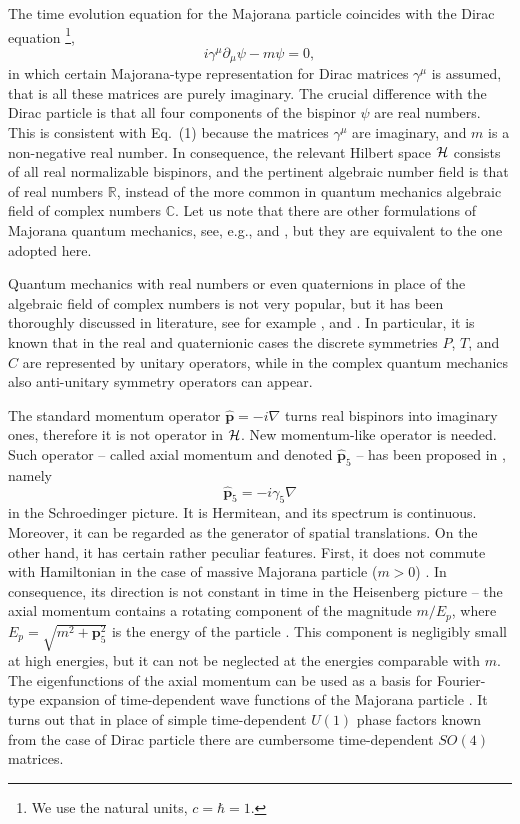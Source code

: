 \documentclass[12pt]{article}
\begin{document}
The time  evolution equation for the Majorana particle coincides with the Dirac equation \footnote{We use the natural units, $c = \hbar =1$.},
 \begin{equation}
 i \gamma^{\mu} \partial_{\mu} \psi - m \psi =0,
 \end{equation}
  in which  certain  Majorana-type  representation 
 for  Dirac matrices $\gamma^{\mu}$ is assumed, that is  all these matrices are  purely imaginary. The crucial difference with the Dirac particle is that  all four components of the  bispinor $\psi$   are real numbers. This is consistent with Eq.\ (1) because the matrices $\gamma^{\mu}$ are imaginary, and $m $ is a non-negative real number. In consequence, the relevant Hilbert space  ${\cal H}$ consists of  all real normalizable bispinors, and the pertinent algebraic number field  is that of real numbers $\mathbb{R}$, instead of the more common 
in quantum mechanics algebraic field of complex numbers $\mathbb{C}$. 
Let us note  that there are other formulations of  Majorana quantum mechanics,  see, e.g.,  \cite{6} and \cite{9},  but they are  equivalent to the one adopted  here. 



Quantum mechanics with real numbers or even quaternions in place of the algebraic field of complex numbers is not very popular, but it has been thoroughly discussed in literature, see for example \cite{11}, \cite{12} and \cite{13}. In particular, it is known that in the real and quaternionic cases the discrete symmetries  $P$, $T$, and $C$ are represented by unitary operators, while in the complex quantum mechanics also anti-unitary symmetry operators can appear. 



The  standard momentum operator $\hat{\mathbf{p}}= - i \nabla$  turns  real bispinors  into  imaginary ones,  therefore it is not  operator in ${\cal H}$.  New momentum-like operator  is needed.   Such operator -- called  axial momentum and denoted  $\hat{\mathbf{p}}_5$ -- has been proposed  in \cite{10}, namely \[ \hat{\mathbf{p}}_5 = -i \gamma_5 \nabla  \] 
in the Schroedinger picture.  It is Hermitean, and its  spectrum is continuous.  Moreover,  it can be regarded as the generator of spatial translations. On the other hand, it has  certain rather peculiar features.  First,  it does not commute with Hamiltonian   in the case of massive Majorana particle   ($m >0$) . In consequence,  its direction  is not constant in time in the Heisenberg picture --   the axial momentum contains a rotating component of the magnitude $m/E_p$, where $E_p=\sqrt{m^2 +\mathbf{p}_5^2} $ is the energy of the particle \cite{10}. This component is  negligibly small at high energies, but  it can not be neglected at the energies comparable with $m$.   The eigenfunctions of the axial momentum 
can be used as a basis for Fourier-type expansion of  time-dependent wave functions of the Majorana particle \cite{10}. It turns out that in place of simple  time-dependent  $U(1)$  phase factors  known from the case of  Dirac particle  there are cumbersome time-dependent $SO(4)$  matrices.  
\end{document}
